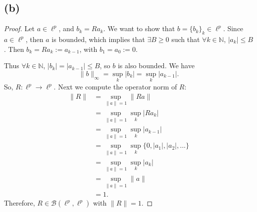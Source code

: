 \documentclass{article}
\begin{document}
\subsection*{(b)}
\begin{proof}
	Let $a \in \ell^p$, and $b_k=R a_k$. We want to show that $b = \{b_k\}_k \in \ell^p$. Since $a \in \ell^p$, then $a$ is bounded, which implies that $\exists B \geq 0$ such that $\forall k \in \mathbb{N}$, $|a_k| \leq B$. Then $b_k = Ra_k := a_{k-1}$, with $b_1 = a_0 := 0$.
	
	Thus $\forall k \in \mathbb{N}$, $|b_k| = |a_{k-1}|\leq B$, so $b$ is also bounded. We have
	\begin{equation}
		\|b\|_{\infty} = \sup_k |b_k| = \sup_k |a_{k-1}|.
	\end{equation}
	So, $R: \ell^p \rightarrow \ell^p$. Next we compute the operator norm of $R$:
	\begin{align}
		\|R\| &= \sup_{\|a\|=1}\|Ra\| \\
		&= \sup_{\|a\|=1}\sup_k |Ra_k| \\
		&= \sup_{\|a\|=1}\sup_k|a_{k-1}| \\
		&= \sup_{\|a\|=1}\sup_k \{0, |a_1|, |a_2|, ...\} \\
		&= \sup_{\|a\|=1}\sup_k |a_k| \\
		&= \sup_{\|a\|=1}\|a\| \\
		&= 1.
	\end{align}
	Therefore, $R\in\mathcal{B}(\ell^p, \ell^p)$ with $\|R\|=1$.
\end{proof}
\end{document}
